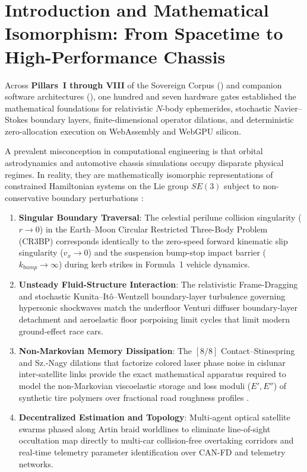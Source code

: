 \documentclass[11pt,a4paper,reqno]{article}
\def\mathrm#1{#1}%
\theoremstyle{plain}
\theoremstyle{definition}
\theoremstyle{remark}
\numberwithin{equation}{section}
\begin{document}
\section{Introduction and Mathematical Isomorphism: From Spacetime to High-Performance Chassis}

Across \textbf{Pillars~I through VIII} of the Sovereign Corpus (\cite{PillarI_SPDE_v6, PillarII_Automata_v10, PillarIII_Finite_v10, PillarIV_TMDHash_v12, PillarV_Aerospace_v10, PillarVI_Cislunar_v11, PillarVII_16Body_v11, UnmaniPillarVIII2026}) and companion software architectures (\cite{AncientRunes2026, ActOne2026, SubTranslate2026}), one hundred and seven hardware gates established the mathematical foundations for relativistic $N$-body ephemerides, stochastic Navier--Stokes boundary layers, finite-dimensional operator dilations, and deterministic zero-allocation execution on WebAssembly and WebGPU silicon. 

A prevalent misconception in computational engineering is that orbital astrodynamics and automotive chassis simulations occupy disparate physical regimes. In reality, they are mathematically isomorphic representations of constrained Hamiltonian systems on the Lie group $\mathrm{SE}(3)$ subject to non-conservative boundary perturbations \cite{MarsdenRatiu1999}:
\begin{enumerate}[leftmargin=1.8em,itemsep=2pt]
  \item \textbf{Singular Boundary Traversal}: The celestial perilune collision singularity ($r \to 0$) in the Earth--Moon Circular Restricted Three-Body Problem (CR3BP) corresponds identically to the zero-speed forward kinematic slip singularity ($v_x \to 0$) \cite{Pacejka2012} and the suspension bump-stop impact barrier ($k_{\mathrm{bump}} \to \infty$) during kerb strikes in Formula~1 vehicle dynamics.
  \item \textbf{Unsteady Fluid-Structure Interaction}: The relativistic Frame-Dragging and stochastic Kunita--It\^{o}--Wentzell boundary-layer turbulence governing hypersonic shockwaves match the underfloor Venturi diffuser boundary-layer detachment \cite{ZhangZerihan2003} and aeroelastic floor porpoising limit cycles that limit modern ground-effect race cars.
  \item \textbf{Non-Markovian Memory Dissipation}: The $[8/8]$ Contact--Stinespring and Sz.-Nagy dilations \cite{SzNagyFoias1970} that factorize colored laser phase noise in cislunar inter-satellite links provide the exact mathematical apparatus required to model the non-Markovian viscoelastic storage and loss moduli ($E', E''$) of synthetic tire polymers over fractional road roughness profiles \cite{Persson2001, Grosch1959}.
  \item \textbf{Decentralized Estimation and Topology}: Multi-agent optical satellite swarms phased along Artin braid worldlines to eliminate line-of-sight occultation \cite{Artin1947} map directly to multi-car collision-free overtaking corridors and real-time telemetry parameter identification over CAN-FD and telemetry networks.
\end{enumerate}
\end{document}
